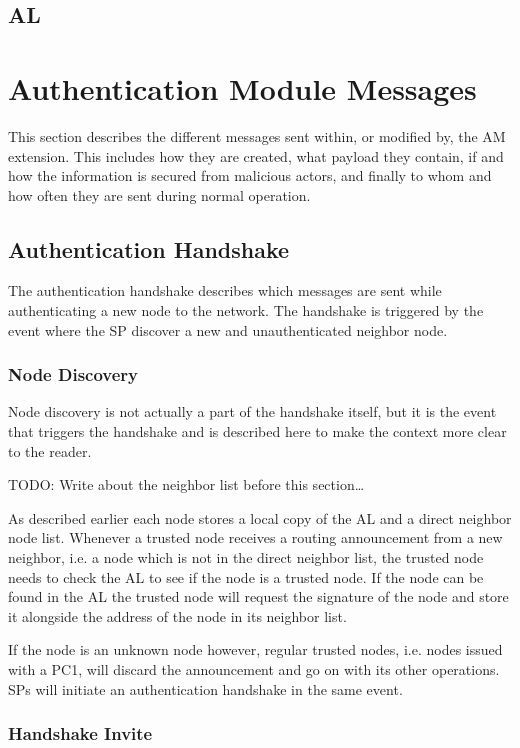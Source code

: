 \subsection{\acf{AL}}


\section{Authentication Module Messages}
\label{sect:am_messages}
This section describes the different messages sent within, or modified by, the
\ac{AM} extension. This includes how they are created, what payload they
contain, if and how the information is secured from malicious actors, and
finally to whom and how often they are sent during normal operation.

\subsection{Authentication Handshake}
The authentication handshake describes which messages are sent while
authenticating a new node to the network. The handshake is triggered by the
event where the \ac{SP} discover a new and unauthenticated neighbor node.

\subsubsection*{Node Discovery}
Node discovery is not actually a part of the handshake itself, but it is the
event that triggers the handshake and is described here to make the context more
clear to the reader.

TODO: Write about the neighbor list before this section\ldots

As described earlier each node stores a local copy of the \ac{AL} and a direct
neighbor node list. Whenever a trusted node receives a routing announcement from
a new neighbor, i.e. a node which is not in the direct neighbor list, the
trusted node needs to check the \ac{AL} to see if the node is a trusted node. If
the node can be found in the \ac{AL} the trusted node will request the signature
of the node and store it alongside the address of the node in its neighbor list.

If the node is an unknown node however, regular trusted nodes, i.e. nodes issued
with a \ac{PC1}, will discard the announcement and go on with its other
operations. \acp{SP} will initiate an authentication handshake in the same
event.

\subsubsection*{Handshake Invite}

